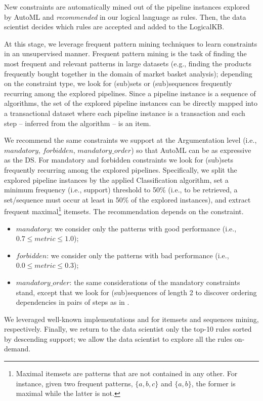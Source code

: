New constraints are automatically mined out of the pipeline instances explored by AutoML and \emph{recommended} in our logical language as rules.
Then, the data scientist decides which rules are accepted and added to the LogicalKB.


At this stage, we leverage frequent pattern mining techniques to learn constraints in an unsupervised manner.
Frequent pattern mining is the task of finding the most frequent and relevant patterns in large datasets (e.g., finding the products frequently bought together in the domain of market basket analysis); depending on the constraint type, we look for (sub)sets \cite{srikant1995mining} or (sub)sequences \cite{srikant1996mining} frequently recurring among the explored pipelines.
Since a pipeline instance is a sequence of algorithms, the set of the explored pipeline instances can be directly mapped into a transactional dataset \cite{srikant1995mining} where each pipeline instance is a transaction and each step -- inferred from the algorithm -- is an item.

We recommend the same constraints we support at the Argumentation level (i.e., $mandatory$, $forbidden$, $mandatory\_order$) so that AutoML can be as expressive as the DS.
For mandatory and forbidden constraints we look for (sub)sets \cite{srikant1995mining} frequently recurring among the explored pipelines.
Specifically, we split the explored pipeline instances by the applied Classification algorithm, set a minimum frequency (i.e., support) threshold to 50\% (i.e., to be retrieved, a set/sequence must occur at least in 50\% of the explored instances), and extract frequent maximal\footnote{Maximal itemsets are patterns that are not contained in any other.
For instance, given two frequent patterns, $\{a, b, c\}$ and $\{a, b\}$, the former is maximal while the latter is not.
}
itemsets.
The recommendation depends on the constraint.
\begin{itemize}
    \item $mandatory$: we consider only the patterns with good performance (i.e., $0.7 \leq metric \leq 1.0$); 
    \item $forbidden$: we consider only the patterns with bad performance (i.e., $0.0 \leq metric \leq 0.3$);
    \item $mandatory\_order$: the same considerations of the mandatory constraints stand, except that we look for (sub)sequences \cite{srikant1996mining} of length 2 to discover ordering dependencies in pairs of steps as in \cite{giovanelli2021data}.   
\end{itemize}
We leveraged well-known implementations \cite{raschkas_2018_mlxtend} and \cite{seq2pat2022} for itemsets and sequences mining, respectively.
Finally, we return to the data scientist only the top-10 rules sorted by descending support; we allow the data scientist to explore all the rules on-demand.

